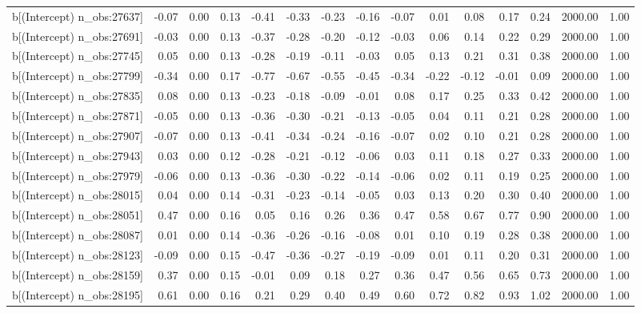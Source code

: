\begin{table}[ht]
\begin{tabular}{rrrrrrrrrrrrrrr}
  b[(Intercept) n\_obs:27637] & -0.07 & 0.00 & 0.13 & -0.41 & -0.33 & -0.23 & -0.16 & -0.07 & 0.01 & 0.08 & 0.17 & 0.24 & 2000.00 & 1.00 \\ 
  b[(Intercept) n\_obs:27691] & -0.03 & 0.00 & 0.13 & -0.37 & -0.28 & -0.20 & -0.12 & -0.03 & 0.06 & 0.14 & 0.22 & 0.29 & 2000.00 & 1.00 \\ 
  b[(Intercept) n\_obs:27745] & 0.05 & 0.00 & 0.13 & -0.28 & -0.19 & -0.11 & -0.03 & 0.05 & 0.13 & 0.21 & 0.31 & 0.38 & 2000.00 & 1.00 \\ 
  b[(Intercept) n\_obs:27799] & -0.34 & 0.00 & 0.17 & -0.77 & -0.67 & -0.55 & -0.45 & -0.34 & -0.22 & -0.12 & -0.01 & 0.09 & 2000.00 & 1.00 \\ 
  b[(Intercept) n\_obs:27835] & 0.08 & 0.00 & 0.13 & -0.23 & -0.18 & -0.09 & -0.01 & 0.08 & 0.17 & 0.25 & 0.33 & 0.42 & 2000.00 & 1.00 \\ 
  b[(Intercept) n\_obs:27871] & -0.05 & 0.00 & 0.13 & -0.36 & -0.30 & -0.21 & -0.13 & -0.05 & 0.04 & 0.11 & 0.21 & 0.28 & 2000.00 & 1.00 \\ 
  b[(Intercept) n\_obs:27907] & -0.07 & 0.00 & 0.13 & -0.41 & -0.34 & -0.24 & -0.16 & -0.07 & 0.02 & 0.10 & 0.21 & 0.28 & 2000.00 & 1.00 \\ 
  b[(Intercept) n\_obs:27943] & 0.03 & 0.00 & 0.12 & -0.28 & -0.21 & -0.12 & -0.06 & 0.03 & 0.11 & 0.18 & 0.27 & 0.33 & 2000.00 & 1.00 \\ 
  b[(Intercept) n\_obs:27979] & -0.06 & 0.00 & 0.13 & -0.36 & -0.30 & -0.22 & -0.14 & -0.06 & 0.02 & 0.11 & 0.19 & 0.25 & 2000.00 & 1.00 \\ 
  b[(Intercept) n\_obs:28015] & 0.04 & 0.00 & 0.14 & -0.31 & -0.23 & -0.14 & -0.05 & 0.03 & 0.13 & 0.20 & 0.30 & 0.40 & 2000.00 & 1.00 \\ 
  b[(Intercept) n\_obs:28051] & 0.47 & 0.00 & 0.16 & 0.05 & 0.16 & 0.26 & 0.36 & 0.47 & 0.58 & 0.67 & 0.77 & 0.90 & 2000.00 & 1.00 \\ 
  b[(Intercept) n\_obs:28087] & 0.01 & 0.00 & 0.14 & -0.36 & -0.26 & -0.16 & -0.08 & 0.01 & 0.10 & 0.19 & 0.28 & 0.38 & 2000.00 & 1.00 \\ 
  b[(Intercept) n\_obs:28123] & -0.09 & 0.00 & 0.15 & -0.47 & -0.36 & -0.27 & -0.19 & -0.09 & 0.01 & 0.11 & 0.20 & 0.31 & 2000.00 & 1.00 \\ 
  b[(Intercept) n\_obs:28159] & 0.37 & 0.00 & 0.15 & -0.01 & 0.09 & 0.18 & 0.27 & 0.36 & 0.47 & 0.56 & 0.65 & 0.73 & 2000.00 & 1.00 \\ 
  b[(Intercept) n\_obs:28195] & 0.61 & 0.00 & 0.16 & 0.21 & 0.29 & 0.40 & 0.49 & 0.60 & 0.72 & 0.82 & 0.93 & 1.02 & 2000.00 & 1.00 \\ 

\end{tabular}
\end{table}
